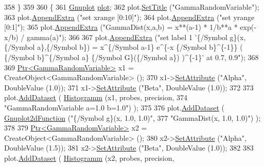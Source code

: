 \begin{DoxyCode}
358   \}
359 
360   \{
361     \hyperlink{classns3_1_1Gnuplot}{Gnuplot} \hyperlink{lte__amc_8m_a5942306abe9f005572e4344e3cdef528}{plot};
362     plot.\hyperlink{classns3_1_1Gnuplot_ac01f15633d49f0239f8a45293a1e04f0}{SetTitle} (\textcolor{stringliteral}{"GammaRandomVariable"});
363     plot.\hyperlink{classns3_1_1Gnuplot_a649a3041b9d0ea21a212b5ad9b28ecbf}{AppendExtra} (\textcolor{stringliteral}{"set xrange [0:10]"});
364     plot.\hyperlink{classns3_1_1Gnuplot_a649a3041b9d0ea21a212b5ad9b28ecbf}{AppendExtra} (\textcolor{stringliteral}{"set yrange [0:1]"});
365     plot.\hyperlink{classns3_1_1Gnuplot_a649a3041b9d0ea21a212b5ad9b28ecbf}{AppendExtra} (\textcolor{stringliteral}{"GammaDist(x,a,b) = x**(a-1) * 1/b**a * exp(-x/b) / gamma(a)"});
366 
367     plot.\hyperlink{classns3_1_1Gnuplot_a649a3041b9d0ea21a212b5ad9b28ecbf}{AppendExtra} (\textcolor{stringliteral}{"set label 1 '\{/Symbol g\}(x,\{/Symbol a\},\{/Symbol b\}) = x^\{/Symbol a-1\}
       e^\{-x \{/Symbol b\}^\{-1\}\} ( \{/Symbol b\}^\{/Symbol a\} \{/Symbol G\}(\{/Symbol a\}) )^\{-1\}' at 0.7, 0.9"});
368 
369     \hyperlink{classns3_1_1Ptr}{Ptr<GammaRandomVariable>} x1 = CreateObject<GammaRandomVariable> ();
370     x1->\hyperlink{classns3_1_1ObjectBase_ac60245d3ea4123bbc9b1d391f1f6592f}{SetAttribute} (\textcolor{stringliteral}{"Alpha"}, DoubleValue (1.0));
371     x1->\hyperlink{classns3_1_1ObjectBase_ac60245d3ea4123bbc9b1d391f1f6592f}{SetAttribute} (\textcolor{stringliteral}{"Beta"}, DoubleValue (1.0));
372 
373     plot.\hyperlink{classns3_1_1Gnuplot_a306ec724a327cf9ab699700f31fca0a1}{AddDataset} ( \hyperlink{main-random-variable_8cc_a2cfd3837ab3f2e816cf53486d7a186b5}{Histogramm} (x1, probes, precision,
374                                   \textcolor{stringliteral}{"GammaRandomVariable a=1.0 b=1.0"}) );
375 
376     plot.\hyperlink{classns3_1_1Gnuplot_a306ec724a327cf9ab699700f31fca0a1}{AddDataset} ( \hyperlink{classns3_1_1Gnuplot2dFunction}{Gnuplot2dFunction} (\textcolor{stringliteral}{"\{/Symbol g\}(x, 1.0, 1.0)"},
377                                          \textcolor{stringliteral}{"GammaDist(x, 1.0, 1.0)"}) );
378 
379     \hyperlink{classns3_1_1Ptr}{Ptr<GammaRandomVariable>} x2 = CreateObject<GammaRandomVariable> ();
380     x2->\hyperlink{classns3_1_1ObjectBase_ac60245d3ea4123bbc9b1d391f1f6592f}{SetAttribute} (\textcolor{stringliteral}{"Alpha"}, DoubleValue (1.5));
381     x2->\hyperlink{classns3_1_1ObjectBase_ac60245d3ea4123bbc9b1d391f1f6592f}{SetAttribute} (\textcolor{stringliteral}{"Beta"}, DoubleValue (1.0));
382 
383     plot.\hyperlink{classns3_1_1Gnuplot_a306ec724a327cf9ab699700f31fca0a1}{AddDataset} ( \hyperlink{main-random-variable_8cc_a2cfd3837ab3f2e816cf53486d7a186b5}{Histogramm} (x2, probes, precision,

\end{DoxyCode}
